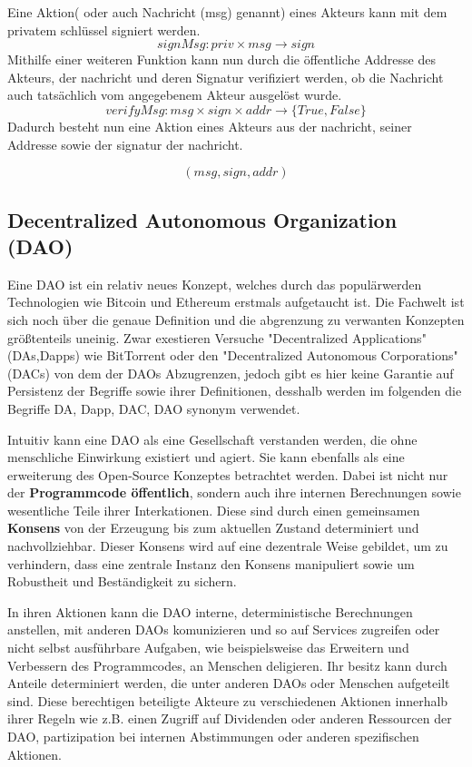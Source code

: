 \documentclass[a4paper,12pt]{report}
\begin{document}
Eine Aktion( oder auch Nachricht (msg) genannt) eines Akteurs kann mit dem privatem schlüssel signiert werden.
\[ signMsg: priv \times msg \rightarrow sign \] 
Mithilfe einer weiteren Funktion kann nun durch die öffentliche Addresse des Akteurs, der nachricht und deren Signatur verifiziert werden, ob die Nachricht auch tatsächlich vom angegebenem Akteur ausgelöst wurde.
\[ verifyMsg: msg \times sign \times addr \rightarrow \{ True, False \} \] 
Dadurch besteht nun eine Aktion eines Akteurs aus der nachricht, seiner Addresse sowie der signatur der nachricht.

\[ (msg, sign, addr) \]

\subsection{Decentralized Autonomous Organization (DAO)}
Eine DAO ist ein relativ neues Konzept, welches durch das populärwerden Technologien wie Bitcoin und Ethereum erstmals aufgetaucht ist. Die Fachwelt ist sich noch über die genaue Definition und die abgrenzung zu verwanten Konzepten größtenteils uneinig. Zwar exestieren Versuche "Decentralized Applications" (DAs,Dapps) wie BitTorrent oder den "Decentralized Autonomous Corporations" (DACs) von dem der DAOs Abzugrenzen, jedoch gibt es hier keine Garantie auf Persistenz der Begriffe sowie ihrer Definitionen, desshalb werden im folgenden die Begriffe DA, Dapp, DAC, DAO synonym verwendet.

Intuitiv kann eine DAO als eine Gesellschaft verstanden werden, die ohne menschliche Einwirkung existiert und agiert. Sie kann ebenfalls als eine erweiterung des Open-Source Konzeptes betrachtet werden. Dabei ist nicht nur der \textbf{Programmcode öffentlich}, sondern auch ihre internen Berechnungen sowie wesentliche Teile ihrer Interkationen. Diese sind durch einen gemeinsamen \textbf{Konsens} von der Erzeugung bis zum aktuellen Zustand determiniert und nachvollziehbar. Dieser Konsens wird auf eine dezentrale Weise gebildet, um zu verhindern, dass eine zentrale Instanz den Konsens manipuliert sowie um Robustheit und Beständigkeit zu sichern.

In ihren Aktionen kann die DAO interne, deterministische Berechnungen anstellen, mit anderen DAOs komunizieren und so auf Services zugreifen oder nicht selbst ausführbare Aufgaben, wie beispielsweise das Erweitern und Verbessern des Programmcodes, an Menschen deligieren. Ihr besitz kann durch Anteile determiniert werden, die unter anderen DAOs oder Menschen aufgeteilt sind. Diese berechtigen beteiligte Akteure zu verschiedenen Aktionen innerhalb ihrer Regeln wie z.B. einen Zugriff auf Dividenden oder anderen Ressourcen der DAO, partizipation bei internen Abstimmungen oder anderen spezifischen Aktionen. 
\end{document}
